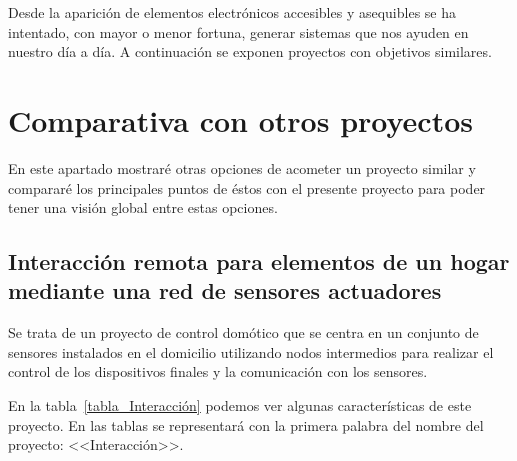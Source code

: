 \begin{comment}
\capitulo{6}{Trabajos relacionados}
Este apartado sería parecido a un estado del arte de una tesis o tesina. En un trabajo final grado no parece obligada su presencia, aunque se puede dejar a juicio del tutor el incluir un pequeño resumen comentado de los trabajos y proyectos ya realizados en el campo del proyecto en curso. 
\end{comment}


Desde la aparición de elementos electrónicos accesibles y asequibles se ha intentado, con mayor o menor fortuna, generar sistemas que nos ayuden en nuestro día a día. A continuación se exponen proyectos con objetivos similares.

\section{Comparativa con otros proyectos}
En este apartado mostraré otras opciones de acometer un proyecto similar y compararé los principales puntos de éstos con el presente proyecto para poder tener una visión global entre estas opciones.

\subsection{Interacción remota para elementos de un hogar mediante una red de sensores actuadores}
Se trata de un proyecto de control domótico que se centra en un conjunto de sensores instalados en el domicilio utilizando nodos intermedios para realizar el control de los dispositivos finales y la comunicación con los sensores.

En la tabla~\ref{tabla_Interacción} podemos ver algunas características de este proyecto.
En las tablas se representará con la primera palabra del nombre del proyecto: <<Interacción>>.

